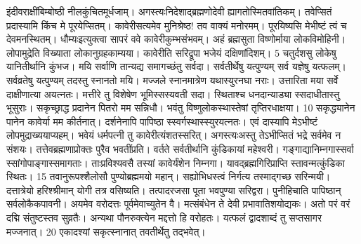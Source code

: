 इंदीवराक्षींबिम्बोष्ठी नीलकुंचितमूर्धजाम्।
 अगस्त्यःनिदेशाद्ब्रह्मणोदेवी ह्यागतोस्मितवांतिकम्।
 तवेप्सितं प्रदास्यामि किंच मे पूरयेप्सितम्।
 कावेरीसत्यमेव मुनिश्रेष्ठ! तव वाक्यं मनोरमम्।
 पूरयिष्यसि मेभीष्टं त्वं च देवमनस्थितम्।
 धौम्यःइत्युक्त्वा सापरं ववे कावेरीकुम्भसंभवम्।
 अहं ब्रह्मसुता विष्णोर्माया लोकविमोहिनी।
 लोपामुद्रेति विख्याता लोकानुग्रहकाम्यया।
 कावेरीति सरिद्रूपा भजेयं दक्षिणांदिशम्।
 5 चतुर्दशसु लोकेषु यानितीर्थानि कुंभज।
 मयि सर्वाणि तान्यद्य समागच्छंतु सर्वदा।
 सर्वतीर्थेषु यत्पुण्यम् सर्व यज्ञेषु यत्फलम्।
 सर्वव्रतेषु यत्पुण्यम् तदस्तु स्नानतो मयि।
 मज्जले स्नानमात्रेण यथास्युरनघा नराः।
 उत्तारिता मया सर्वे दाक्षीणात्या अयत्नतः।
 मत्तीरे तु विशेषेण भूमिस्सस्यवती सदा।
 स्थिताश्च धनदान्याड्या स्सदाधीतास्तु भूसुराः।
 सकृच्छ्राद्ध प्रदानेन पितरो मम सन्निधौ।
 भवंतु विष्णुलोकस्थास्तेषां तृप्तिरधाक्षया।
 10
सकृद्ध्यानेन पानेन कावेर्या मम कीर्तनात्।
 दर्शनेनापि पापिष्ठा स्स्वर्गस्थास्स्युरयत्नतः।
 एवं दास्यापि मेऽभीष्टं लोपमुद्राख्ययाप्यहम्।
 भवेयं धर्मपत्नी तु कावेरीत्यंशतस्सरित्।
 अगस्त्यःअस्तु तेऽभीप्सितं भद्रे सर्वमेव न संशयः।
 तत्तेवब्रह्मणाप्रोक्तः पुरैव भवतींप्रति।
 वर्तते सर्वतीर्थानि कुंडिकायां महेश्वरी।
 गङ्गाद्यानिम्नगास्सर्वा स्सांगोपाङ्गास्समागताः।
 ताःप्रविश्यवसै तस्यां कावेर्यंशेन निम्नगा।
 यावद्ब्रह्मगिरिप्राप्ति स्तावन्मत्कुंडिका स्थितः।
 15 तवानुरूपश्शैलोसौ पुण्योब्रह्ममयो महान्।
 सह्योभिधस्त्वं निर्गत्य तस्माद्गच्छ सरिन्मयी।
 दत्तात्रेयो हरिश्श्रीमान् योगी तत्र वसिष्यति।
 तत्पादरजसा पूता भवपुण्या सरिद्वरा।
 पुनीहिचाति पापिष्ठान् सर्वलोकैकपावनी।
 अयमेव वरोदत्तः पूर्वमेवाच्युतेन वै।
 मत्संबंधेन ते देवी प्रभावातिशयोद्यकः।
 अतो परं वरं दद्मि संतुष्टस्तव सुव्रतैः।
 अन्यथा पौनरुक्त्येन मद्दत्तो हि वरोहतः।
 यत्फलं द्वादशाब्दं तु सप्तसागर मज्जनात्।
 20 एकादश्यां सकृत्स्नानात् तवतीर्थेतु तद्भवेत्।

